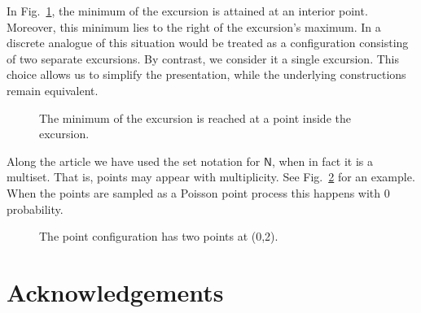 \documentclass[12pt]{article}
\numberwithin{equation}{section}
\newcommand{\sN}{\mathsf{N}}
\begin{document}
In Fig.~\ref{ex3}, the minimum of the excursion is attained at an interior point. Moreover, this minimum lies to the right of the excursion’s maximum.
In \cite{FNRW} a discrete analogue of this situation would be treated as a configuration consisting of two separate excursions.
By contrast, we consider it a single excursion.
This choice allows us to simplify the presentation, while the underlying constructions remain equivalent.

\begin{figure}[ht]
\centering
{}
\caption{The minimum of the excursion is reached at a point inside the excursion.}
\label{ex3}
\end{figure}

Along the article we have used the set notation for $\sN$, when in fact it is a multiset. That is, points may appear with multiplicity. See Fig.~\ref{ex4} for an example. When the points are sampled as a Poisson point process this happens with $0$ probability.

\begin{figure}[ht]
\centering
{}
\caption{The point configuration has two points at (0,2).}
\label{ex4}
\end{figure}

\section*{Acknowledgements}
\label{grazie}
\end{document}
